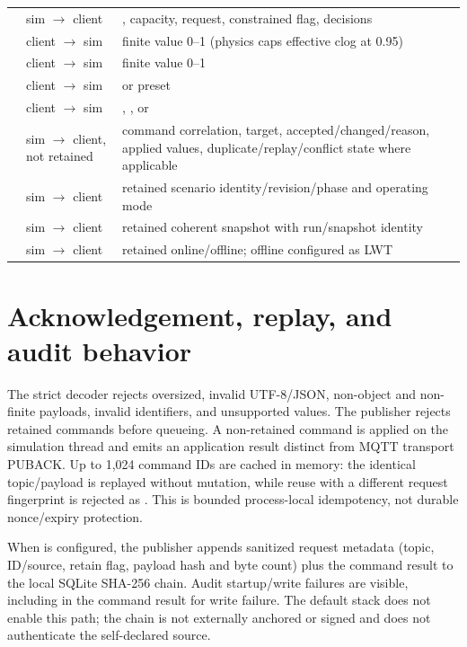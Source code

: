 \begin{longtable}{L{0.34\textwidth}L{0.15\textwidth}L{0.40\textwidth}}
 & sim $\to$ client & , capacity, request, constrained flag, decisions\\
 & client $\to$ sim & finite value 0--1 (physics caps effective clog at 0.95)\\
 & client $\to$ sim & finite value 0--1\\
 & client $\to$ sim &  or  preset\\
 & client $\to$ sim & , , or \\
 & sim $\to$ client, not retained & command correlation, target, accepted/changed/reason, applied values, duplicate/replay/conflict state where applicable\\
 & sim $\to$ client & retained scenario identity/revision/phase and operating mode\\
 & sim $\to$ client & retained coherent snapshot with run/snapshot identity\\
 & sim $\to$ client & retained online/offline; offline configured as LWT\\
\bottomrule
\end{longtable}

\section*{Acknowledgement, replay, and audit behavior}
The strict decoder rejects oversized, invalid UTF-8/JSON, non-object and non-finite payloads, invalid identifiers, and unsupported values. The publisher rejects retained commands before queueing. A non-retained command is applied on the simulation thread and emits an application result distinct from MQTT transport PUBACK. Up to 1,024 command IDs are cached in memory: the identical topic/payload is replayed without mutation, while reuse with a different request fingerprint is rejected as . This is bounded process-local idempotency, not durable nonce/expiry protection.

When  is configured, the publisher appends sanitized request metadata (topic, ID/source, retain flag, payload hash and byte count) plus the command result to the local SQLite SHA-256 chain. Audit startup/write failures are visible, including in the command result for write failure. The default stack does not enable this path; the chain is not externally anchored or signed and does not authenticate the self-declared source.
